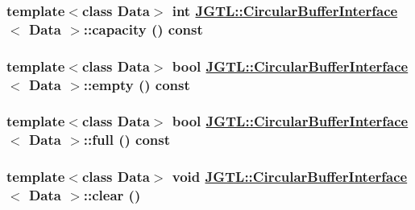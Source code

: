 \hypertarget{class_j_g_t_l_1_1_circular_buffer_interface_3125c67d85e0345f68b9f6aefdfb968c}{
\subsubsection[capacity]{\setlength{\rightskip}{0pt plus 5cm}template$<$class Data$>$ int \hyperlink{class_j_g_t_l_1_1_circular_buffer_interface}{JGTL::Circular\-Buffer\-Interface}$<$ Data $>$::capacity () const}}
\label{class_j_g_t_l_1_1_circular_buffer_interface_3125c67d85e0345f68b9f6aefdfb968c}


\hypertarget{class_j_g_t_l_1_1_circular_buffer_interface_9c2a55866f731c40ee278835996c35fb}{
\subsubsection[empty]{\setlength{\rightskip}{0pt plus 5cm}template$<$class Data$>$ bool \hyperlink{class_j_g_t_l_1_1_circular_buffer_interface}{JGTL::Circular\-Buffer\-Interface}$<$ Data $>$::empty () const}}
\label{class_j_g_t_l_1_1_circular_buffer_interface_9c2a55866f731c40ee278835996c35fb}


\hypertarget{class_j_g_t_l_1_1_circular_buffer_interface_4f8940cb0b82b7ba6b5967f397fda1d1}{
\subsubsection[full]{\setlength{\rightskip}{0pt plus 5cm}template$<$class Data$>$ bool \hyperlink{class_j_g_t_l_1_1_circular_buffer_interface}{JGTL::Circular\-Buffer\-Interface}$<$ Data $>$::full () const}}
\label{class_j_g_t_l_1_1_circular_buffer_interface_4f8940cb0b82b7ba6b5967f397fda1d1}


\hypertarget{class_j_g_t_l_1_1_circular_buffer_interface_edb3d8c798008fada3320b2c4beba43e}{
\subsubsection[clear]{\setlength{\rightskip}{0pt plus 5cm}template$<$class Data$>$ void \hyperlink{class_j_g_t_l_1_1_circular_buffer_interface}{JGTL::Circular\-Buffer\-Interface}$<$ Data $>$::clear ()}}
\label{class_j_g_t_l_1_1_circular_buffer_interface_edb3d8c798008fada3320b2c4beba43e}


